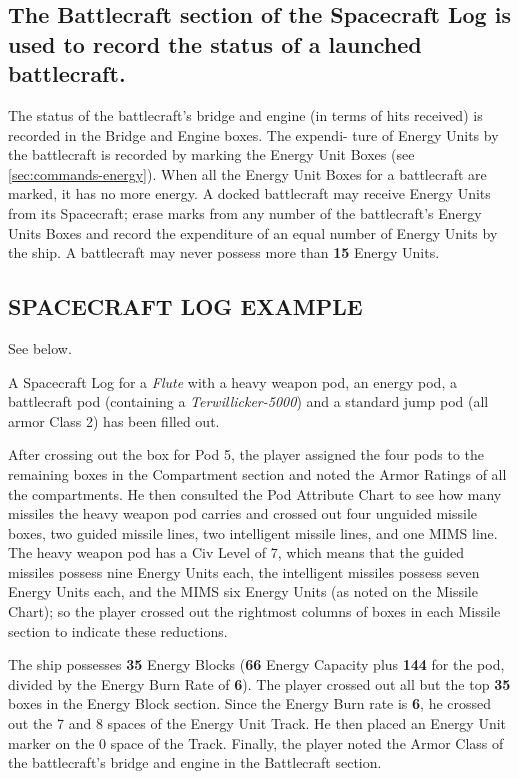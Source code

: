 \subsection[Battlecraft Section]{The Battlecraft section of the
  Spacecraft Log is used to 
  record the status of a launched battlecraft.}
\label{sec:battlecraft}



The status of the battlecraft's bridge and engine (in terms of hits
received) is recorded in the Bridge and Engine boxes. The expendi-
ture of Energy Units by the battlecraft is recorded by marking the
Energy Unit Boxes (see \ref{sec:commands-energy}). When all the Energy
Unit Boxes for a battlecraft are marked, it has no more energy. A
docked battlecraft may receive Energy Units from its Spacecraft; erase
marks from any number of the battlecraft's Energy Units Boxes and
record the expenditure of an equal number of Energy Units by the ship.
A battlecraft may never possess more than \textbf{15} Energy Units.


\subsection*{SPACECRAFT LOG EXAMPLE}
\label{sec:spacecraft-log-example}



See below. 

A Spacecraft Log for a \emph{Flute} with a heavy weapon pod, an energy
pod, a battlecraft pod (containing a \emph{Terwillicker-5000}) and a
standard jump pod (all armor Class 2) has been filled out.

After crossing out the box for Pod 5, the player assigned the four
pods to the remaining boxes in the Compartment section and noted the
Armor Ratings of all the compartments. He then consulted the Pod
Attribute Chart to see how many missiles the heavy weapon pod carries
and crossed out four unguided missile boxes, two guided missile lines,
two intelligent missile lines, and one MIMS line. The heavy weapon pod
has a Civ Level of 7, which means that the guided missiles possess
nine Energy Units each, the intelligent missiles possess seven Energy
Units each, and the MIMS six Energy Units (as noted on the Missile
Chart); so the player crossed out the rightmost columns of boxes in
each Missile section to indicate these reductions.

The ship possesses \textbf{35} Energy Blocks (\textbf{66} Energy
Capacity plus \textbf{144} for the pod, divided by the Energy Burn
Rate of \textbf{6}). The player crossed out all but the top
\textbf{35} boxes in the Energy Block section. Since the Energy Burn
rate is \textbf{6}, he crossed out the 7 and 8 spaces of the Energy
Unit Track. He then placed an Energy Unit marker on the 0 space of the
Track. Finally, the player noted the Armor Class of the battlecraft's
bridge and engine in the Battlecraft section.


